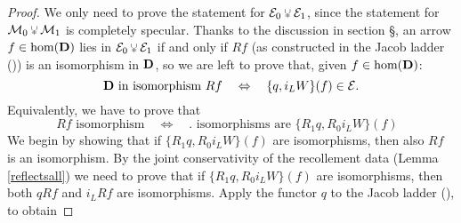 \begin{proof}
We only need to prove the statement for $\EE_0\glue\EE_1$, since the statement for $\MM_0\glue\MM_1$ is completely specular. Thanks to the discussion in section \S{}, an arrow $f\in\text{hom}(\mathbf{D})$ lies in $\EE_0\glue \EE_1$ if and only if $Rf$ (as constructed in the Jacob ladder ()) is an isomorphism in $\mathbf{D}$, so we are left to prove that, given $f\in\text{hom}(\mathbf{D})$:
\[
\text{$\mathbf{D}$ in isomorphism $Rf$}\quad\Leftrightarrow\quad 
\text{$\{q, i_LW\}(f)\in \mathcal{E}$}.
\]
Equivalently, we have to prove that
\[
\text{$Rf$ isomorphism}\quad\Leftrightarrow\quad 
\text{. isomorphisms are $\{R_1q, R_0i_LW\}(f)$ }
\]
We begin by showing that if $\{ R_1q, R_0i_LW\}(f)$ are isomorphisms, then also $Rf$ is an isomorphism.
By the joint conservativity of the recollement data (Lemma \ref{reflectsall}) we need to prove that  if $\{ R_1q, R_0i_LW\}(f)$ are isomorphisms, then both $qRf$ and $i_LRf$ are isomorphisms.
Apply the functor $q$ to the Jacob ladder (), to obtain


\end{proof}
